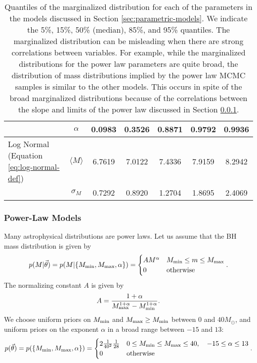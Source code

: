 \documentclass[preprint]{aastex}
\newcommand{\Msun}{M_\odot}
\newcommand{\Mmin}{M_{\textnormal{min}}}
\newcommand{\Mmax}{M_{\textnormal{max}}}
\newcommand{\vtheta}{\vec{\theta}}
\begin{document}
\begin{table}
\begin{center}
\begin{tabular}{|l|c|c|c|c|c|c|}
       \hline
       & $\alpha$ & 0.0983 &  0.3526 & 0.8871 &  0.9792 &  0.9936 \\
       \hline \hline
       Log Normal (Equation \eqref{eq:log-normal-def}) & $\langle M \rangle$ & 
       6.7619 &  7.0122 &  7.4336  &  7.9159  &  8.2942 \\
       \hline 
       & $\sigma_M$ & 0.7292  &  0.8920  & 1.2704  &  1.8695  &  2.4069 \\
       \hline
    \end{tabular}
  \end{center}
  \caption{\label{tab:low-mass-parametric} Quantiles of the
    marginalized distribution for each of the parameters in the models
    discussed in Section \ref{sec:parametric-models}.  We indicate
    the 5\%, 15\%, 50\% (median), 85\%, and 95\% quantiles.  The
    marginalized distribution can be misleading when there are strong
    correlations between variables.  For example, while the
    marginalized distributions for the power law parameters are quite
    broad, the distribution of mass distributions implied by the power
    law MCMC samples is similar to the other models.  This occurs in
    spite of the broad marginalized distributions because of the
    correlations between the slope and limits of the power law
    discussed in Section \ref{sec:power-law}.}
\end{table}

\subsubsection{Power-Law Models}
\label{sec:power-law}

Many astrophysical distributions are power laws.  Let us assume that
the BH mass distribution is given by
\begin{equation}
  \label{eq:power-law-dist}
  p(M|\vtheta) = p(M|\{\Mmin, \Mmax, \alpha \}) =
  \begin{cases}
    A M^\alpha & \Mmin \leq m \leq \Mmax \\
    0 & \textnormal{otherwise}
  \end{cases}.
\end{equation}
The normalizing constant $A$ is given by 
\begin{equation}
  A = \frac{1+\alpha}{\Mmax^{1+\alpha} - \Mmin^{1+\alpha}}.
\end{equation}
We choose uniform priors on $\Mmin$ and $\Mmax \geq \Mmin$ between 0 and
$40 \Msun$, and uniform priors on the exponent $\alpha$ in a broad
range between $-15$ and $13$:
\begin{equation}
  p(\vtheta) = p(\{\Mmin, \Mmax, \alpha\}) = 
  \begin{cases}
    2 \frac{1}{40^2}\frac{1}{28} & 0 \leq \Mmin \leq \Mmax
    \leq 40, \quad -15 \leq \alpha \leq 13 \\
    0 & \textnormal{otherwise}
  \end{cases}.
\end{equation}
\end{document}
